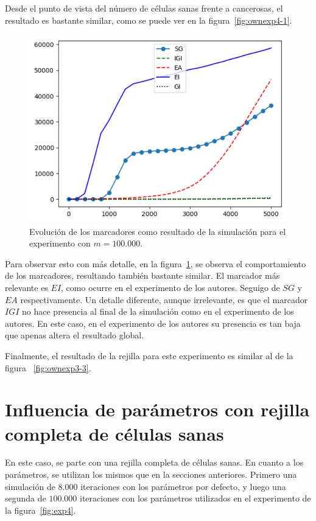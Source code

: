 Desde el punto de vista del número de células sanas frente a cancerosas, el resultado es
bastante similar, como se puede ver en la figura~\ref{fig:ownexp4-1}.

\begin{figure}[h]
\centering
\includegraphics[scale=0.8]{figures/experiments/exp4/mutations}
\caption{Evolución de los marcadores como resultado de la simulación para el experimento con $m = 100.000$.}
\label{fig:ownexp4-2}
\end{figure}

Para observar esto con más detalle, en la figura~\ref{fig:ownexp4-2}, se observa el comportamiento
de los marcadores, resultando también bastante similar. El marcador más relevante es $EI$,
como ocurre en el experimento de los autores. Seguigo de $SG$ y $EA$ respectivamente. Un detalle
diferente, aunque irrelevante, es que el marcador $IGI$ no hace presencia al final de la
simulación como en el experimento de los autores. En este caso, en el experimento de los autores
su presencia es tan baja que apenas altera el resultado global.

Finalmente, el resultado de la rejilla para este experimento es similar al de la figura ~\ref{fig:ownexp3-3}.

\clearpage

\section{Influencia de parámetros con rejilla completa de células sanas}

En este caso, se parte con una rejilla completa de células sanas. En cuanto a los parámetros,
se utilizan los mismos que en la secciones anteriores. Primero una simulación de $8.000$ iteraciones
con los parámetros por defecto, y luego una segunda de $100.000$ iteraciones con los parámetros
utilizados en el experimento de la figura~\ref{fig:exp4}.

